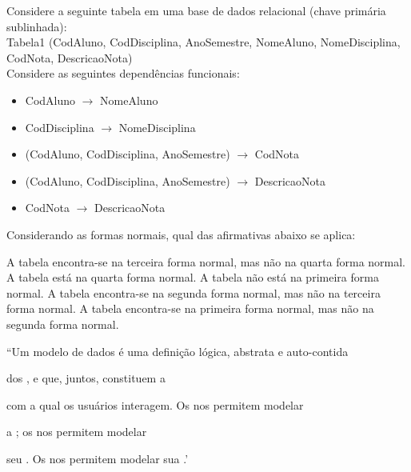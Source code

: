 \documentclass[12pt, addpoints]{exam}
\begin{document}
\begin{questions}
\question

Considere a seguinte tabela em uma base de dados relacional (chave primária sublinhada):\\

Tabela1 (CodAluno, CodDisciplina, AnoSemestre, NomeAluno, NomeDisciplina, CodNota, DescricaoNota)\\

Considere as seguintes dependências funcionais:

\begin{itemize}

    \item CodAluno \(\rightarrow\) NomeAluno

    \item CodDisciplina \(\rightarrow\) NomeDisciplina

    \item (CodAluno, CodDisciplina, AnoSemestre) \(\rightarrow\) CodNota

    \item (CodAluno, CodDisciplina, AnoSemestre) \(\rightarrow\) DescricaoNota

    \item CodNota \(\rightarrow\) DescricaoNota

\end{itemize}



Considerando as formas normais, qual das afirmativas abaixo se aplica:
\begin{choices}
\choice A tabela encontra-se na terceira forma normal, mas não na quarta forma normal.
\choice A tabela está na quarta forma normal.
\choice A tabela não está na primeira forma normal.
\choice A tabela encontra-se na segunda forma normal, mas não na terceira forma normal.
\choice A tabela encontra-se na primeira forma normal, mas não na segunda forma normal.
\end{choices}

\question

``Um modelo de dados é uma definição lógica, abstrata e auto-contida

dos ,  e  que, juntos, constituem a 

com a qual os usuários interagem. Os  nos permitem modelar

a ; os  nos permitem modelar

seu . Os  nos permitem modelar sua .'




\end{questions}
\end{document}
